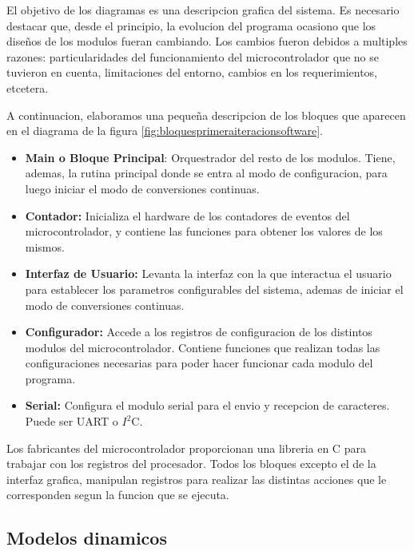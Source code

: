 El objetivo de los diagramas es una descripcion grafica del sistema. Es necesario destacar que, desde el principio, la evolucion del programa ocasiono que los diseños de los modulos fueran cambiando. Los cambios fueron debidos a multiples razones: particularidades del funcionamiento del microcontrolador que no se tuvieron en cuenta, limitaciones del entorno, cambios en los requerimientos, etcetera. 

A continuacion, elaboramos una pequeña descripcion de los bloques que aparecen en el diagrama de la figura \ref{fig:bloquesprimeraiteracionsoftware}.

\begin{itemize}
  \item \textbf{Main o Bloque Principal}: Orquestrador del resto de los modulos. Tiene, ademas, la rutina principal donde se entra al modo de configuracion, para luego iniciar el modo de conversiones continuas.
  \item \textbf{Contador:} Inicializa el hardware de los contadores de eventos del microcontrolador, y contiene las funciones para obtener los valores de los mismos.
  \item \textbf{Interfaz de Usuario:} Levanta la interfaz con la que interactua el usuario para establecer los parametros configurables del sistema, ademas de iniciar el modo de conversiones continuas.
  \item \textbf{Configurador:} Accede a los registros de configuracion de los distintos modulos del microcontrolador. Contiene funciones que realizan todas las configuraciones necesarias para poder hacer funcionar cada modulo del programa.
  \item \textbf{Serial:} Configura el modulo serial para el envio y recepcion de caracteres. Puede ser UART o $I^{2}$C.
\end{itemize}


Los fabricantes del microcontrolador proporcionan una libreria en C para trabajar con los registros del procesador. Todos los bloques excepto el de la interfaz grafica, manipulan registros para realizar las distintas acciones que le corresponden segun la funcion que se ejecuta.  


\subsection{Modelos dinamicos} %
\label{it2:sub:modelos_dinamicos}

